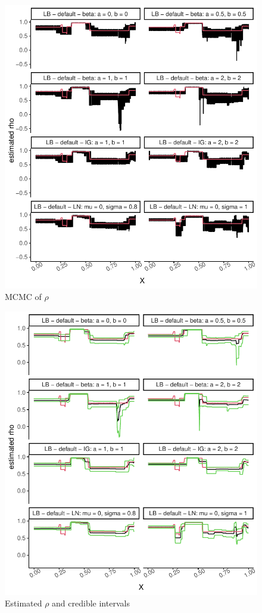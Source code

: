 \documentclass{amsart}
\begin{document}
\begin{figure}[ht]
	\centering
	\includegraphics[width=0.95\linewidth]{mcmc_rho_1.pdf}
	\caption{MCMC of $\rho$}
	\label{fig:mcmc:rho:1}
\end{figure}

\begin{figure}[ht]
	\centering
	\includegraphics[width=0.95\linewidth]{predicted_rho_1.pdf}
	\caption{Estimated $\rho$ and credible intervals}
	\label{fig:pred:rho:1}
\end{figure}
\end{document}
